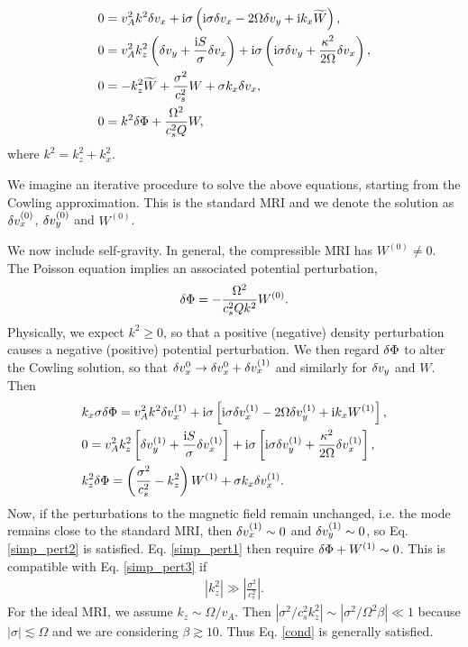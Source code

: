 \begin{align}
  &  0= v_A^2k^2\delta v_x + \mathrm{i}\sigma\left(\mathrm{i}\sigma \delta v_x - 2\Omega\delta v_y + \mathrm{i} k_x \widetilde{W}\right),\label{simp1}\\
  &  0= v_A^2k_z^2\left(\delta v_y + \frac{\mathrm{i} S
  }{\sigma}\delta v_x\right) + \mathrm{i}\sigma\left(\mathrm{i}\sigma\delta v_y +
  \frac{\kappa^2}{2\Omega}\delta v_x\right),\label{simp2}\\
  & 0 = -k_z^2\widetilde{W} + \frac{\sigma^2}{c_s^2}W + \sigma k_x \delta v_x, \label{simp3}\\
  & 0 = k^2\delta \Phi + \frac{\Omega^2}{c_s^2Q}W,\label{simp4}
\end{align}
where $k^2 = k_z^2 + k_x^2$. 

We imagine an iterative procedure to solve the above equations,
starting from the Cowling approximation. %
This is the standard MRI and we denote the solution as
$\delta v_x^{(0)}$, $\delta v_y^{(0)}$ and $W^{(0)}$. 

We now include self-gravity. In general, the compressible MRI has
$W^{(0)}\neq0$. The Poisson equation implies
an associated potential perturbation,    
\begin{align} 
  \delta \Phi = -\frac{\Omega^2}{c_s^2 Q k^2} W^{(0)}.
\end{align}
Physically, we expect $k^2\geq0$, so that a positive (negative) density
perturbation causes a negative (positive) potential perturbation. We
then regard $\delta \Phi$ to alter the Cowling solution, so
that $\delta v_x^{0} \to \delta v_x^{0} + \delta v_x^{(1)}$ and similarly for $\delta v_y$ and
$W$. Then 
\begin{align}
  &   k_x\sigma \delta \Phi = v_A^2k^2\delta v_x^{(1)} + \mathrm{i}\sigma\left[\mathrm{i}\sigma
  \delta v_x^{(1)} - 2\Omega\delta v_y^{(1)} + \mathrm{i} k_x W^{(1)}\right], \label{simp_pert1}\\ 
  &  0= v_A^2k_z^2\left[\delta v_y^{(1)} + \frac{\mathrm{i} S
    }{\sigma}\delta v_x^{(1)}\right] + \mathrm{i}\sigma\left[\mathrm{i}\sigma\delta v_y^{(1)} +
  \frac{\kappa^2}{2\Omega}\delta v_x^{(1)}\right],\label{simp_pert2}\\
  & k_z^2\delta \Phi  = \left(\frac{\sigma^2}{c_s^2}-k_z^2\right)W^{(1)} +
  \sigma k_x \delta v_x^{(1)}.\label{simp_pert3} 
\end{align}
Now, if the perturbations to the magnetic field remain
unchanged, i.e. the mode remains close to the standard MRI, then
$\delta v_x^{(1)} \sim 0$ and $\delta v_y^{(1)}\sim0$, so Eq. \ref{simp_pert2} is
satisfied. Eq. \ref{simp_pert1} then require $\delta \Phi +
W^{(1)}\sim0$. This is compatible with Eq. \ref{simp_pert3} if 
\begin{align}
  \left|k_z^2\right| \gg \left|\frac{\sigma^2}{c_s^2}\right|. \label{cond}
\end{align}
For the ideal MRI,  we assume $k_z\sim \Omega/v_A$. Then
$|\sigma^2/c_s^2k_z^2|\sim |\sigma^2/\Omega^2\beta|\ll1$ because
$|\sigma|\lesssim \Omega$ and we are considering $\beta\gtrsim
10$. Thus Eq. \ref{cond} is generally satisfied.   

